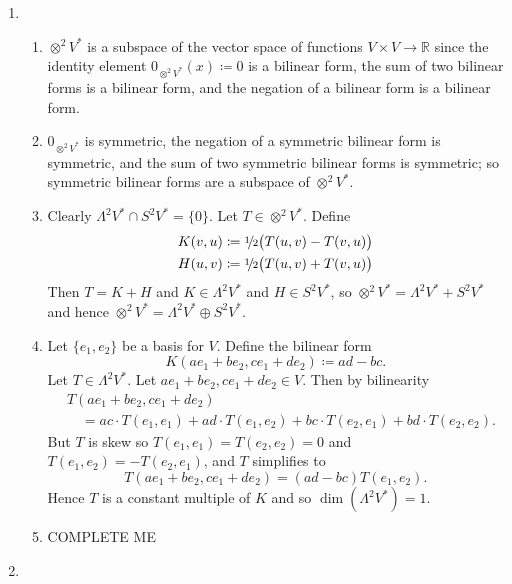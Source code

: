 \documentclass[a4paper, 12pt]{article}
\newcommand{\R}{\mathbb{R}}
\newcommand{\half}{\sfrac{1\!}2}
\begin{document}
\begin{enumerate}

\item \begin{enumerate}

\item \(\otimes^2V^*\) is a subspace of the vector space of functions \(V\times V\to\R\) since the identity element \(0_{\otimes^2V^*}(x)\coloneqq0\) is a bilinear form, the sum of two bilinear forms is a bilinear form, and the negation of a bilinear form is a bilinear form.

\item \(0_{\otimes^2V^*}\) is symmetric, the negation of a symmetric bilinear form is symmetric, and the sum of two symmetric bilinear forms is symmetric; so symmetric bilinear forms are a subspace of \(\otimes^2V^*\).

\item Clearly \(\Lambda^2V^*\cap S^2V^*=\{0\}\). Let \(T\in\otimes^2V^*\). Define
\begin{gather*}
K(v,u)\coloneqq\half\big(T(u,v)-T(v,u)\big)\\
H(u,v)\coloneqq\half\big(T(u,v)+T(v,u)\big)
\end{gather*}
Then \(T=K+H\) and \(K\in\Lambda^2V^*\) and \(H\in S^2V^*\), so \(\otimes^2V^*=\Lambda^2V^*+S^2V^*\) and hence \(\otimes^2V^*=\Lambda^2V^*\oplus S^2V^*\).

\item Let \(\{e_1,e_2\}\) be a basis for \(V\). Define the bilinear form
\[K(ae_1+be_2,ce_1+de_2)\coloneqq ad-bc.\]
Let \(T\in\Lambda^2V^*\). Let \(ae_1+be_2,ce_1+de_2\in V\). Then by bilinearity
\begin{align*}
&T(ae_1+be_2,ce_1+de_2)\\
&\quad=ac\cdot T(e_1,e_1)+ad\cdot T(e_1,e_2)+bc\cdot T(e_2,e_1)+bd\cdot T(e_2,e_2).
\end{align*}
But \(T\) is skew so \(T(e_1,e_1)=T(e_2,e_2)=0\) and \(T(e_1,e_2)=-T(e_2,e_1)\), and \(T\) simplifies to
\[T(ae_1+be_2,ce_1+de_2)=(ad-bc)T(e_1,e_2).\]
Hence \(T\) is a constant multiple of \(K\) and so \(\dim(\Lambda^2V^*)=1\).
\item {\color{red} COMPLETE ME}

\end{enumerate}

\item \begin{enumerate}


\end{enumerate}
\end{enumerate}
\end{document}
